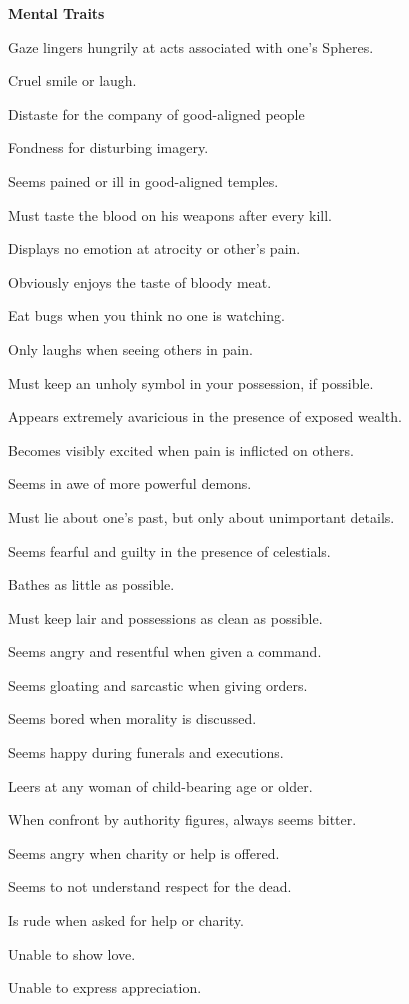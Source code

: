 \begin{multicols}{2}
\begin{description*}
\item \textbf{Mental Traits}
\begin{itemize*}
\item Gaze lingers hungrily at acts associated with one's Spheres.
\item Cruel smile or laugh.
\item Distaste for the company of good-aligned people
\item Fondness for disturbing imagery.
\item Seems pained or ill in good-aligned temples.
\item Must taste the blood on his weapons after every kill.
\item Displays no emotion at atrocity or other's pain.
\item Obviously enjoys the taste of bloody meat.
\item Eat bugs when you think no one is watching.
\item Only laughs when seeing others in pain.
\item Must keep an unholy symbol in your possession, if possible.
\item Appears extremely avaricious in the presence of exposed wealth.
\item Becomes visibly excited when pain is inflicted on others.
\item Seems in awe of more powerful demons.
\item Must lie about one's past, but only about unimportant details.
\item Seems fearful and guilty in the presence of celestials.
\item Bathes as little as possible.
\item Must keep lair and possessions as clean as possible.
\item Seems angry and resentful when given a command.
\item Seems gloating and sarcastic when giving orders.
\item Seems bored when morality is discussed.
\item Seems happy during funerals and executions.
\item Leers at any woman of child-bearing age or older.
\item When confront by authority figures, always seems bitter.
\item Seems angry when charity or help is offered.
\item Seems to not understand respect for the dead.
\item Is rude when asked for help or charity.
\item Unable to show love.
\item Unable to express appreciation.
\end{itemize*}
\end{description*}

\end{multicols}

